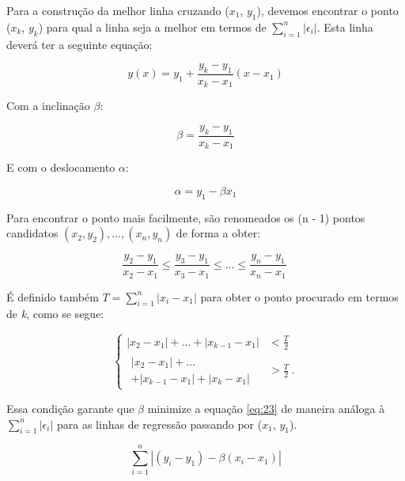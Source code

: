 Para a construção da melhor linha cruzando ($x_1$, $y_1$), devemos encontrar o ponto ($x_k$, $y_k$) para qual a linha seja a melhor em termos de $\sum_{i=1}^{n}|\epsilon_{i}|$. Esta linha deverá ter a seguinte equação:

\begin{equation}\label{eq:19}
y(x) = y_1 + \frac{y_k - y_1}{x_k - x_1} (x - x_1)
\end{equation}

Com a inclinação $\beta$:

\begin{equation}\label{eq:20}
\beta = \frac{y_k - y_1}{x_k - x_1}
\end{equation}

E com o deslocamento $\alpha$:

\begin{equation}\label{eq:21}
\alpha = y_1 - \beta x_1
\end{equation}

Para encontrar o ponto mais facilmente, são renomeados os (n - 1) pontos candidatos ${ \left(x_2,
	y_2\right), \ldots, \left(x_n,y_n\right) }$ de forma a obter:
	
\begin{equation*}
    \frac{y_2-y_1}{x_2-x_1} \leq \frac{y_3-y_1}{x_3-x_1}\leq \ldots \leq \frac{y_n-y_1}{x_n-x_1}\:
\end{equation*}

É definido também ${ T=\sum\limits_{i=1}^n \left|x_i-x_1\right| }$ para obter o ponto procurado em termos de \textit{k}, como se segue:

\begin{equation}\label{eq:22}
\begin{cases}
    \left|x_2-x_1\right| + \ldots + \left|x_{k-1}-x_1\right| & < \frac{T}{2} \\
    \begin{array}{l}\left|x_2-x_1\right| + \ldots \\+ \left|x_{k-1}-x_1\right| + \left|x_k-x_1\right|\end{array} & > \frac{T}{2}\:.
  \end{cases}
\end{equation}

Essa condição garante que $\beta$ minimize a equação \ref{eq:23} de maneira análoga à $\sum_{i=1}^{n}|\epsilon_{i}|$ para as linhas de regressão passando por ($x_1$, $y_1$).

\begin{equation}\label{eq:23}
\sum_{i=1}^n\left| \left(y_i-y_1\right)-\beta\left(x_i-x_1\right)\right|
\end{equation}

